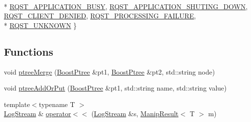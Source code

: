 \begin{DoxyCompactItemize}
\\*
\hyperlink{namespacekisscpp_af5792fb0f68695c1a1e7a4c720d9262eaa411a8dcb60e0303c992c74dd4df4f43}{R\-Q\-S\-T\-\_\-\-A\-P\-P\-L\-I\-C\-A\-T\-I\-O\-N\-\_\-\-B\-U\-S\-Y}, 
\hyperlink{namespacekisscpp_af5792fb0f68695c1a1e7a4c720d9262ea1e1bd5f607c7cc861e2f7173253115b4}{R\-Q\-S\-T\-\_\-\-A\-P\-P\-L\-I\-C\-A\-T\-I\-O\-N\-\_\-\-S\-H\-U\-T\-I\-N\-G\-\_\-\-D\-O\-W\-N}, 
\hyperlink{namespacekisscpp_af5792fb0f68695c1a1e7a4c720d9262eab5769a29096e43de01864a3322d45a03}{R\-Q\-S\-T\-\_\-\-C\-L\-I\-E\-N\-T\-\_\-\-D\-E\-N\-I\-E\-D}, 
\hyperlink{namespacekisscpp_af5792fb0f68695c1a1e7a4c720d9262ea808534e6dd0075c88704e0149b5b7589}{R\-Q\-S\-T\-\_\-\-P\-R\-O\-C\-E\-S\-S\-I\-N\-G\-\_\-\-F\-A\-I\-L\-U\-R\-E}, 
\\*
\hyperlink{namespacekisscpp_af5792fb0f68695c1a1e7a4c720d9262ea8b54c6e47b50ce90a375d79b957f5ddb}{R\-Q\-S\-T\-\_\-\-U\-N\-K\-N\-O\-W\-N}
 \}
\end{DoxyCompactItemize}
\subsection*{Functions}
\begin{DoxyCompactItemize}
\item 
void \hyperlink{namespacekisscpp_a36b9e65a0a3786bd85198e4530c65bf9}{ptree\-Merge} (\hyperlink{boost__ptree_8hpp_ab36820650b8e0db36402aea80485633c}{Boost\-Ptree} \&pt1, \hyperlink{boost__ptree_8hpp_ab36820650b8e0db36402aea80485633c}{Boost\-Ptree} \&pt2, std\-::string node)
\item 
void \hyperlink{namespacekisscpp_a6bb122f9d1f472c12420a2ec59fdc287}{ptree\-Add\-Or\-Put} (\hyperlink{boost__ptree_8hpp_ab36820650b8e0db36402aea80485633c}{Boost\-Ptree} \&pt1, std\-::string name, std\-::string value)
\item 
{\footnotesize template$<$typename T $>$ }\\\hyperlink{classkisscpp_1_1_log_stream}{Log\-Stream} \& \hyperlink{namespacekisscpp_a7a056a2a9cc68e577ced326d1ebf86c1}{operator$<$$<$} (\hyperlink{classkisscpp_1_1_log_stream}{Log\-Stream} \&s, \hyperlink{classkisscpp_1_1_manip_result}{Manip\-Result}$<$ T $>$ m)
\end{DoxyCompactItemize}


